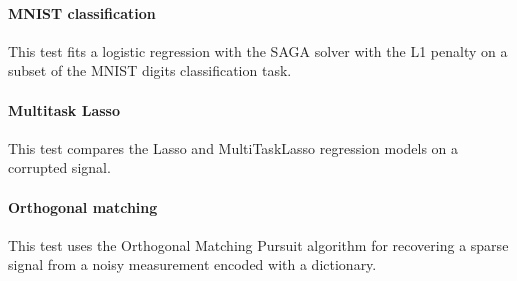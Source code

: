 \documentclass[11pt]{article}
\begin{document}
\paragraph{MNIST classification}

This test fits a logistic regression with the SAGA solver with the L1 penalty  
on a subset of the MNIST digits classification task.



\paragraph{Multitask Lasso}

This test compares the Lasso and MultiTaskLasso regression models
on a corrupted signal.



\paragraph{Orthogonal matching}

This test uses the Orthogonal Matching Pursuit algorithm
for recovering a sparse signal from a noisy measurement encoded with a dictionary.
\end{document}
